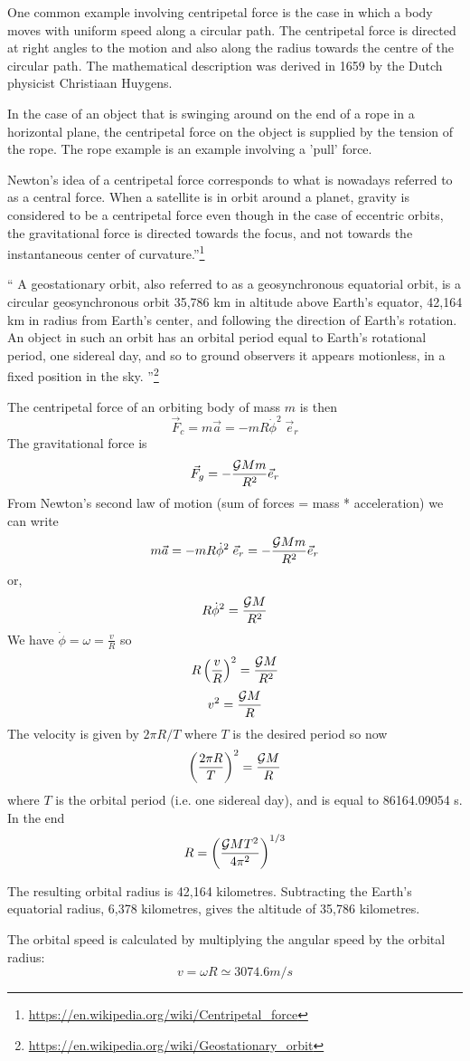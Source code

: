 One common example involving centripetal force is the case in which a body moves with uniform speed along a circular path. The centripetal force is directed at right angles to the motion and also along the radius towards the centre of the circular path. The mathematical description was derived in 1659 by the Dutch physicist Christiaan Huygens.

In the case of an object that is swinging around on the end of a rope in a horizontal plane, the centripetal force on the object is supplied by the tension of the rope. The rope example is an example involving a 'pull' force. 

Newton's idea of a centripetal force corresponds to what is nowadays referred to as a central force. When a satellite is in orbit around a planet, gravity is considered to be a centripetal force even though in the case of eccentric orbits, the gravitational force is directed towards the focus, and not towards the instantaneous center of curvature.''\footnote{\url{https://en.wikipedia.org/wiki/Centripetal_force}}

``
A geostationary orbit, also referred to as a geosynchronous equatorial orbit, is a circular geosynchronous orbit 35,786 km in altitude above Earth's equator, 42,164 km in radius from Earth's center, and following the direction of Earth's rotation. An object in such an orbit has an orbital period equal to Earth's rotational period, one sidereal day, and so to ground observers it appears motionless, in a fixed position in the sky. ''\footnote{\url{https://en.wikipedia.org/wiki/Geostationary_orbit}}

The centripetal force of an orbiting body of mass $m$ is then 
\[
\vec{F}_c = m \vec{a} =- m R \dot{\phi}^2 \; \vec{e}_r 
\]
The gravitational force is 
\[
\vec{F}_g = - \frac{{\cal G } M m }{R^2} \vec{e}_r
\]
From Newton's second law of motion (sum of forces = mass * acceleration) we can write
\[
m \vec{a} =- m R \dot{\phi}^2 \; \vec{e}_r  = - \frac{{\cal G } M m }{R^2} \vec{e}_r
\]
or, 
\[
R \dot{\phi}^2 
= \frac{{\cal G } M  }{R^2} 
\]
We have $\dot{\phi}= \omega = \frac{v}{R}$
so 
\[
R \left(\frac{v}{R} \right)^2
= \frac{{\cal G } M  }{R^2} 
\]
\[
v^2
= \frac{{\cal G } M  }{R} 
\]
The velocity is given by $2 \pi R / T$ where $T$ is the desired period so now
\[
\left( \frac{2 \pi R}{ T} \right)^2
= \frac{{\cal G } M  }{R} 
\]
where $T$ is the orbital period (i.e. one sidereal day), and is equal to 86164.09054 s.
In the end
\[
R = \left( \frac{ {\cal G} M T^2}{4 \pi^2} \right)^{1/3}
\]

The resulting orbital radius is 42,164 kilometres. Subtracting the Earth's equatorial radius, 6,378 kilometres, gives the altitude of 35,786 kilometres.

The orbital speed is calculated by multiplying the angular speed by the orbital radius:
\[
v = \omega R \simeq 3074.6 m/s
\]


